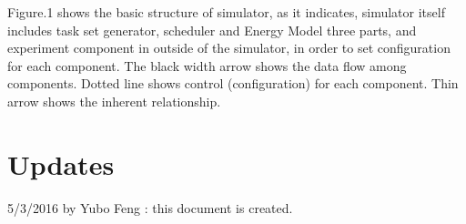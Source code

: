 \documentclass[11pt, oneside]{article}
\begin{document}
Figure.1 shows the basic structure of simulator, as it indicates, simulator itself includes task set generator, scheduler and Energy Model three parts, and experiment component in outside of the simulator, in order to set configuration for each component. The black width arrow shows the data flow among components. Dotted line shows control (configuration) for each component. Thin arrow shows the inherent relationship. 

\section*{Updates}
5/3/2016 by Yubo Feng : this document is created.
\end{document}
